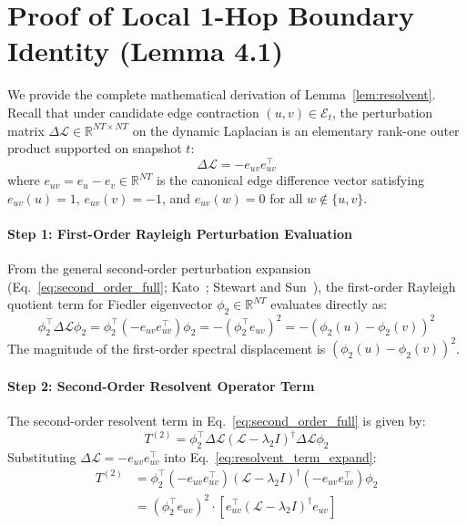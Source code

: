 \documentclass[sigconf]{acmart}
\begin{document}
\section{Proof of Local 1-Hop Boundary Identity (Lemma 4.1)}
\label{app:proof_resolvent}
We provide the complete mathematical derivation of Lemma~\ref{lem:resolvent}. Recall that under candidate edge contraction $(u, v) \in \mathcal{E}_t$, the perturbation matrix $\Delta \mathcal{L} \in \mathbb{R}^{NT \times NT}$ on the dynamic Laplacian is an elementary rank-one outer product supported on snapshot $t$:
\begin{equation}
\Delta \mathcal{L} = - e_{uv} e_{uv}^\top
\end{equation}
where $e_{uv} = e_u - e_v \in \mathbb{R}^{NT}$ is the canonical edge difference vector satisfying $e_{uv}(u) = 1$, $e_{uv}(v) = -1$, and $e_{uv}(w) = 0$ for all $w \notin \{u, v\}$.

\paragraph{Step 1: First-Order Rayleigh Perturbation Evaluation}
From the general second-order perturbation expansion (Eq.~\eqref{eq:second_order_full}; Kato~\cite{kato1995perturbation}; Stewart and Sun~\cite{stewart1990matrix}), the first-order Rayleigh quotient term for Fiedler eigenvector $\phi_2 \in \mathbb{R}^{NT}$ evaluates directly as:
\begin{equation}
\label{eq:first_order_eval}
\phi_2^\top \Delta \mathcal{L} \phi_2 = \phi_2^\top \left( -e_{uv} e_{uv}^\top \right) \phi_2 = - \left( \phi_2^\top e_{uv} \right)^2 = - \left( \phi_2(u) - \phi_2(v) \right)^2
\end{equation}
The magnitude of the first-order spectral displacement is $(\phi_2(u) - \phi_2(v))^2$.

\paragraph{Step 2: Second-Order Resolvent Operator Term}
The second-order resolvent term in Eq.~\eqref{eq:second_order_full} is given by:
\begin{equation}
\label{eq:resolvent_term_expand}
T^{(2)} = \phi_2^\top \Delta \mathcal{L} \left( \mathcal{L} - \lambda_2 I \right)^\dagger \Delta \mathcal{L} \phi_2
\end{equation}
Substituting $\Delta \mathcal{L} = -e_{uv} e_{uv}^\top$ into Eq.~\eqref{eq:resolvent_term_expand}:
\begin{equation}
\begin{split}
T^{(2)} &= \phi_2^\top \left( -e_{uv} e_{uv}^\top \right) \left( \mathcal{L} - \lambda_2 I \right)^\dagger \left( -e_{uv} e_{uv}^\top \right) \phi_2 \\
&= \left( \phi_2^\top e_{uv} \right)^2 \cdot \left[ e_{uv}^\top \left( \mathcal{L} - \lambda_2 I \right)^\dagger e_{uv} \right]
\end{split}
\end{equation}
\end{document}
